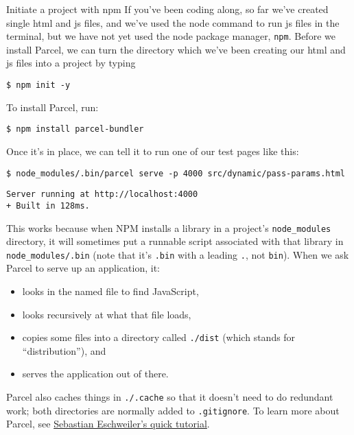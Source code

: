 \begin{aside}{Initiate a project with npm}
If you've been coding along,
so far we've created single html and js files,
and we've used the node command to run js files in the terminal, 
but we have not yet used the node package manager, \texttt{npm}. 
Before we install Parcel, 
we can turn the directory which we've been creating our html and js files into a project
by typing 

\begin{verbatim}
$ npm init -y
\end{verbatim}

\end{aside}


To install Parcel, run:

\begin{verbatim}
$ npm install parcel-bundler
\end{verbatim}

Once it's in place,
we can tell it to run one of our test pages like this:

\begin{verbatim}
$ node_modules/.bin/parcel serve -p 4000 src/dynamic/pass-params.html
\end{verbatim}

\begin{verbatim}
Server running at http://localhost:4000
+ Built in 128ms.
\end{verbatim}

This works because when NPM installs a library in a project's \texttt{node\_modules} directory,
it will sometimes put a runnable script associated with that library in \texttt{node\_modules/.bin}
(note that it's \texttt{.bin} with a leading \texttt{.}, not \texttt{bin}).
When we ask Parcel to serve up an application, it:

\begin{itemize}
\item
  looks in the named file to find JavaScript,
\item
  looks recursively at what that file loads,
\item
  copies some files into a directory called \texttt{./dist} (which stands for ``distribution''), and
\item
  serves the application out of there.
\end{itemize}

Parcel also caches things in \texttt{./.cache} so that it doesn't need to do redundant work;
both directories are normally added to \texttt{.gitignore}.
To learn more about Parcel, see \href{https://medium.com/codingthesmartway-com-blog/getting-started-with-parcel-197eb85a2c8c}{Sebastian Eschweiler's quick tutorial}.

